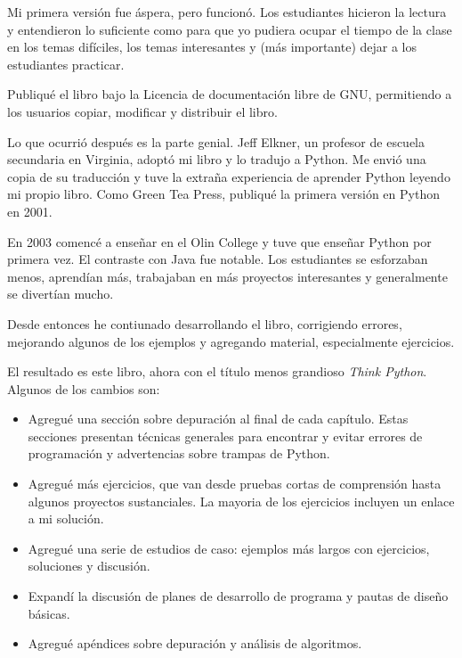 \documentclass[10pt]{book}
\begin{document}
Mi primera versión fue áspera, pero funcionó.  Los estudiantes hicieron la
lectura y entendieron lo suficiente como para que yo pudiera ocupar el tiempo
de la clase en los temas difíciles, los temas interesantes y (más importante)
dejar a los estudiantes practicar.

Publiqué el libro bajo la Licencia de documentación libre de GNU,
permitiendo a los usuarios copiar, modificar y distribuir el libro.

Lo que ocurrió después es la parte genial.  Jeff Elkner, un profesor
de escuela secundaria en Virginia, adoptó mi libro y lo tradujo a Python.
Me envió una copia de su traducción y tuve la extraña experiencia de
aprender Python leyendo mi propio libro. Como Green Tea Press,
publiqué la primera versión en Python en 2001.

En 2003 comencé a enseñar en el Olin College y tuve que enseñar Python
por primera vez.  El contraste con Java fue notable.
Los estudiantes se esforzaban menos, aprendían más, trabajaban en más
proyectos interesantes y generalmente se divertían mucho.

Desde entonces he contiunado desarrollando el libro,
corrigiendo errores, mejorando algunos de los ejemplos y agregando material,
especialmente ejercicios.

El resultado es este libro, ahora con el título menos grandioso
{\em Think Python}.  Algunos de los cambios son:

\begin{itemize}

\item Agregué una sección sobre depuración al final de cada capítulo.
  Estas secciones presentan técnicas generales para encontrar y evitar
  errores de programación y advertencias sobre trampas de Python.

\item Agregué más ejercicios, que van desde pruebas cortas de comprensión
  hasta algunos proyectos sustanciales.  La mayoria de los ejercicios
  incluyen un enlace a mi solución.

\item Agregué una serie de estudios de caso: ejemplos más largos con
  ejercicios, soluciones y discusión.

\item Expandí la discusión de planes de desarrollo de programa y
  pautas de diseño básicas.

\item Agregué apéndices sobre depuración y análisis de algoritmos.

\end{itemize}
\end{document}
